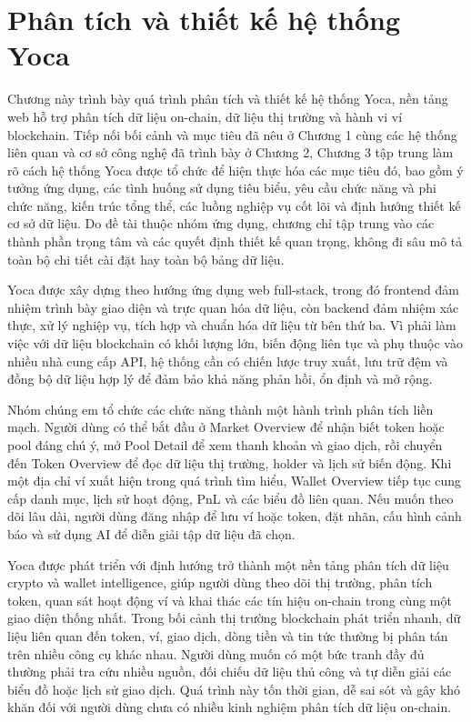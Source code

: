 \chapter{Phân tích và thiết kế hệ thống Yoca}
\label{Chapter3}

Chương này trình bày quá trình phân tích và thiết kế hệ thống Yoca, nền tảng web hỗ trợ phân tích dữ liệu on-chain, dữ liệu thị trường và hành vi ví blockchain. Tiếp nối bối cảnh và mục tiêu đã nêu ở Chương 1 cùng các hệ thống liên quan và cơ sở công nghệ đã trình bày ở Chương 2, Chương 3 tập trung làm rõ cách hệ thống Yoca được tổ chức để hiện thực hóa các mục tiêu đó, bao gồm ý tưởng ứng dụng, các tình huống sử dụng tiêu biểu, yêu cầu chức năng và phi chức năng, kiến trúc tổng thể, các luồng nghiệp vụ cốt lõi và định hướng thiết kế cơ sở dữ liệu. Do đề tài thuộc nhóm ứng dụng, chương chỉ tập trung vào các thành phần trọng tâm và các quyết định thiết kế quan trọng, không đi sâu mô tả toàn bộ chi tiết cài đặt hay toàn bộ bảng dữ liệu.

Yoca được xây dựng theo hướng ứng dụng web full-stack, trong đó frontend đảm nhiệm trình bày giao diện và trực quan hóa dữ liệu, còn backend đảm nhiệm xác thực, xử lý nghiệp vụ, tích hợp và chuẩn hóa dữ liệu từ bên thứ ba. Vì phải làm việc với dữ liệu blockchain có khối lượng lớn, biến động liên tục và phụ thuộc vào nhiều nhà cung cấp API, hệ thống cần có chiến lược truy xuất, lưu trữ đệm và đồng bộ dữ liệu hợp lý để đảm bảo khả năng phản hồi, ổn định và mở rộng.


Nhóm chúng em tổ chức các chức năng thành một hành trình phân tích liền mạch. Người dùng có thể bắt đầu ở Market Overview để nhận biết token hoặc pool đáng chú ý, mở Pool Detail để xem thanh khoản và giao dịch, rồi chuyển đến Token Overview để đọc dữ liệu thị trường, holder và lịch sử biến động. Khi một địa chỉ ví xuất hiện trong quá trình tìm hiểu, Wallet Overview tiếp tục cung cấp danh mục, lịch sử hoạt động, PnL và các biểu đồ liên quan. Nếu muốn theo dõi lâu dài, người dùng đăng nhập để lưu ví hoặc token, đặt nhãn, cấu hình cảnh báo và sử dụng AI để diễn giải tập dữ liệu đã chọn.

Yoca được phát triển với định hướng trở thành một nền tảng phân tích dữ liệu crypto và wallet intelligence, giúp người dùng theo dõi thị trường, phân tích token, quan sát hoạt động ví và khai thác các tín hiệu on-chain trong cùng một giao diện thống nhất. Trong bối cảnh thị trường blockchain phát triển nhanh, dữ liệu liên quan đến token, ví, giao dịch, dòng tiền và tin tức thường bị phân tán trên nhiều công cụ khác nhau. Người dùng muốn có một bức tranh đầy đủ thường phải tra cứu nhiều nguồn, đối chiếu dữ liệu thủ công và tự diễn giải các biểu đồ hoặc lịch sử giao dịch. Quá trình này tốn thời gian, dễ sai sót và gây khó khăn đối với người dùng chưa có nhiều kinh nghiệm phân tích dữ liệu on-chain.

